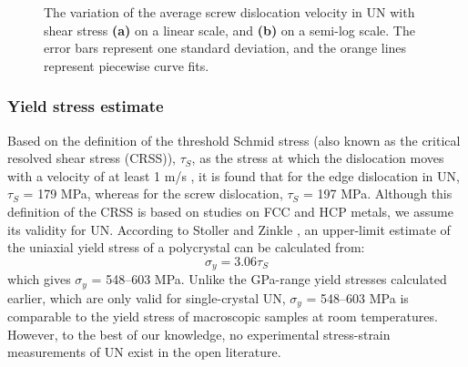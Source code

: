 \documentclass[applsci,article,submit,pdftex,moreauthors]{Definitions/mdpi}
\newcommand{\?}{\stackrel{?}{=}}
\begin{document}
\begin{figure}[h!]
\centering
{}
\hfill
{}
\caption{The variation of the average screw dislocation velocity in UN with shear stress \textbf{(a)} on a linear scale, and \textbf{(b)} on a semi-log scale. The error bars represent one standard deviation, and the orange lines represent piecewise curve fits.}
\label{Fig:DislocPosTimeScrew}
\end{figure}

\subsubsection{Yield stress estimate}

Based on the definition of the threshold Schmid stress (also known as the critical resolved shear stress (CRSS)), $\tau_S$, as the stress at which the dislocation moves with a velocity of at least 1 m/s \cite{Murty2013}, it is found that for the edge dislocation in UN, $\tau_S$ = 179 MPa, whereas for the screw dislocation, $\tau_S$ = 197 MPa. Although this definition of the CRSS is based on studies on FCC and HCP metals, we assume its validity for UN. According to Stoller and Zinkle \cite{Stoller2000}, an upper-limit estimate of the uniaxial yield stress of a polycrystal can be calculated from:
\begin{equation}
\sigma_y = 3.06 \tau_S
\label{Eq:Taylor}
\end{equation}
which gives $\sigma_y$ = 548--603 MPa. Unlike the GPa-range yield stresses calculated earlier, which are only valid for single-crystal UN, $\sigma_y$ = 548--603 MPa is comparable to the yield stress of macroscopic samples at room temperatures. However, to the best of our knowledge, no experimental stress-strain measurements of UN exist in the open literature.
\end{document}
